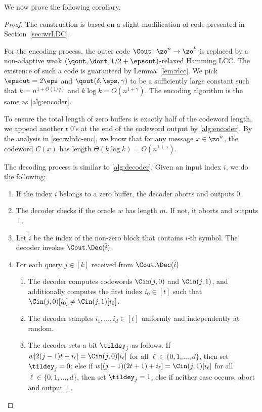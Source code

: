 We now prove the following corollary.

\strongirlcc*

\begin{proof}
The construction is based on a slight modification of code presented in Section~\ref{sec:wrLDC}.

For the encoding process, the outer code $\Cout \colon \zo^n \rightarrow \zo^{k}$ is replaced by a non-adaptive weak $(\qout,\dout,1/2+\epsout)$-relaxed Hamming LCC. 
The existence of such a code is guaranteed by Lemma~\ref{lem:rlcc}.
We pick $\epsout = 2\eps$ and $\qout(\delta, \eps, \gamma)$ to be a sufficiently large constant such that $k = {n^{1+O(1/q)}}$ and $k\log k = O(n^{1+\gamma}) $. 
The encoding algorithm is the same as \cref{alg:encoder}. 

To ensure the total length of zero buffers is exactly half of the codeword length, we append another $t$ 0's at the end of the codeword output by \cref{alg:encoder}. 
By the analysis in \cref{sec:wlrdc-enc}, we know that for any message $x\in\zo^n$, the codeword $C(x)$ has length $\Theta(k\log k) = O(n^{1+\gamma})$.



The decoding process is similar to \cref{alg:decoder}. Given an input index $i$, we do the following: 

\begin{enumerate}
    \item If the index $i$ belongs to a zero buffer, the decoder aborts and outputs $0$. 
    
	\item The decoder checks if the oracle $w$ has length $m$. If not, it aborts and outputs $\bot$.
	
	\item Let $\tilde{i}$ be the index of the non-zero block that contains $i$-th symbol. The decoder invokes $\Cout.\Dec(\tilde{i})$.
	
	\item For each query $j \in [k]$ received from $\Cout.\Dec(\tilde{i})$
	\begin{enumerate}
		\item The decoder computes codewords $\Cin(j, 0)$ and $\Cin(j,1)$, and additionally computes the first index $i_0 \in [t]$ such that $\Cin(j,0)[i_0] \neq \Cin(j,1)[i_0]$.
		
		\item The decoder samples $i_1,\dotsc, i_d \in [t]$ uniformly and independently at random.
		
		\item The decoder sets a bit $\tildey_j$ as follows. 
		If $w[ 2(j-1)t + i_\ell ] = \Cin(j,0)[i_\ell]$ for all $\ell \in \{0,1,\dotsc, d\}$, then set $\tildey_j = 0$; else if $w[ (j-1)(2t+1)+ i_\ell ] = \Cin(j,1)[i_\ell]$ for all $\ell \in \{0,1,\dotsc, d\}$, then set $\tildey_j = 1$; else if neither case occurs, abort and output $\bot$.
		

\end{enumerate}
\end{enumerate}
\end{proof}
